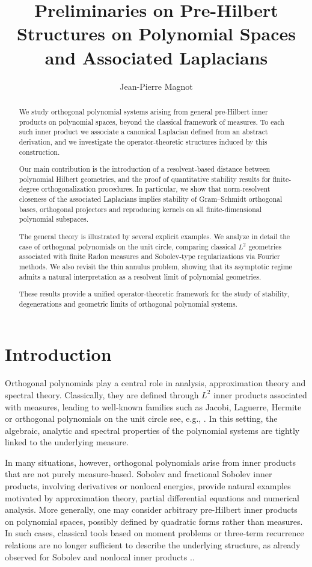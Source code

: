 \documentclass{amsart}
\title[Preliminaries on polynomial Hilbert structures and Laplacians]
{Preliminaries on Pre-Hilbert Structures on Polynomial Spaces and Associated Laplacians}
\author{Jean-Pierre Magnot}
\date{}
\date{}
\numberwithin{equation}{section}
\theoremstyle{definition}
\theoremstyle{remark}
\begin{document}
\maketitle
\begin{abstract}
We study orthogonal polynomial systems arising from general pre-Hilbert inner products
on polynomial spaces, beyond the classical framework of measures.
To each such inner product we associate a canonical Laplacian defined from an abstract
derivation, and we investigate the operator-theoretic structures induced by this construction.

Our main contribution is the introduction of a resolvent-based distance between polynomial
Hilbert geometries, and the proof of quantitative stability results for finite-degree
orthogonalization procedures.
In particular, we show that norm-resolvent closeness of the associated Laplacians implies
stability of Gram--Schmidt orthogonal bases, orthogonal projectors and reproducing kernels
on all finite-dimensional polynomial subspaces.

The general theory is illustrated by several explicit examples.
We analyze in detail the case of orthogonal polynomials on the unit circle, comparing
classical $L^2$ geometries associated with finite Radon measures and Sobolev-type
regularizations via Fourier methods.
We also revisit the thin annulus problem, showing that its asymptotic regime admits
a natural interpretation as a resolvent limit of polynomial geometries.

These results provide a unified operator-theoretic framework for the study of stability,
degenerations and geometric limits of orthogonal polynomial systems.
\end{abstract}

\section{Introduction}

Orthogonal polynomials play a central role in analysis, approximation theory and
spectral theory.
Classically, they are defined through $L^2$ inner products associated with measures,
leading to well-known families such as Jacobi, Laguerre, Hermite or orthogonal polynomials
on the unit circle see, e.g., \cite{Szego,Chihara,Ismail,KoekoekLeskySwarttouw,SimonOPUC1,SimonOPUC2}.
In this setting, the algebraic, analytic and spectral properties of the polynomial systems
are tightly linked to the underlying measure.

In many situations, however, orthogonal polynomials arise from inner products that are
not purely measure-based.
Sobolev and fractional Sobolev inner products, involving derivatives or nonlocal energies,
provide natural examples motivated by approximation theory, partial differential equations
and numerical analysis.
More generally, one may consider arbitrary pre-Hilbert inner products on polynomial spaces,
possibly defined by quadratic forms rather than measures.
In such cases, classical tools based on moment problems or three-term recurrence
relations are no longer sufficient to describe the underlying structure,
as already observed for Sobolev and nonlocal inner products
\cite{MarcellanSobolev,IserlesSobolev}..
\end{document}
